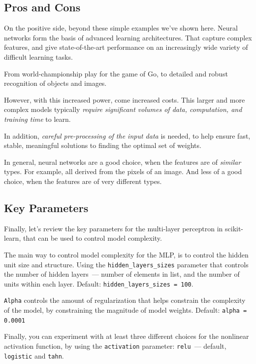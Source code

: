 \begin{multicols}{2}

\subsection{Pros and Cons}

On the positive side, beyond these simple examples we've shown here. Neural networks form the basis of advanced learning architectures. That capture complex features, and give state-of-the-art performance on an increasingly wide variety of difficult learning tasks. 

From world-championship play for the game of Go, to detailed and robust recognition of objects and images. 

However, with this increased power, come increased costs. This larger and more complex models typically \emph{require significant volumes of data, computation, and training time} to learn. 

In addition, \emph{careful pre-processing of the input data} is needed, to help ensure fast, stable, meaningful solutions to finding the optimal set of weights. 

In general, neural networks are a good choice, when the features are of \emph{similar} types. For example, all derived from the pixels of an image. And less of a good choice, when the features are of very different types. 

\subsection{Key Parameters}

Finally, let's review the key parameters for the multi-layer perceptron in scikit-learn, that can be used to control model complexity. 

The main way to control model complexity for the MLP, is to control the hidden unit size and structure. Using the \texttt{hidden_layers_sizes} parameter that controls the number of hidden layers~--- number of elements in list, and the number of units within each layer. Default: \texttt{hidden_layers_sizes = 100}.

\texttt{Alpha} controls the amount of regularization that helps constrain the complexity of the model, by constraining the magnitude of model weights. Default: \texttt{alpha = 0.0001}

Finally, you can experiment with at least three different choices for the nonlinear activation function, by using the \texttt{activation} parameter: \texttt{relu}~--- default, \texttt{logistic} and \texttt{tahn}. 


\end{multicols}

